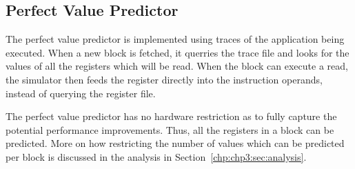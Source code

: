 \subsection{Perfect Value Predictor}

The perfect value predictor is implemented using traces of the application being executed.
When a new block is fetched, it querries the trace file and looks for the values of all the registers which will be read.
When the block can execute a read, the simulator then feeds the register directly into the instruction operands, instead of querying the register file.

The perfect value predictor has no hardware restriction as to fully capture the potential performance improvements.
Thus, all the registers in a block can be predicted.
More on how restricting the number of values which can be predicted per block is discussed in the analysis in Section~\ref{chp:chp3:sec:analysis}.
